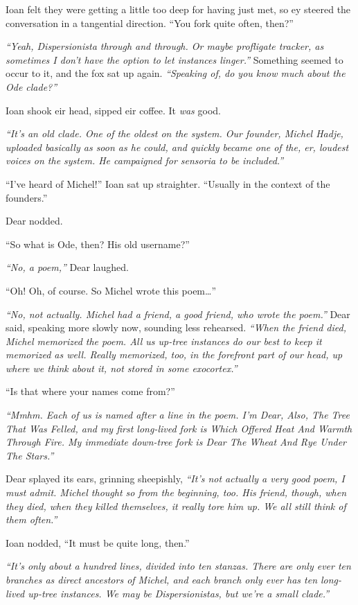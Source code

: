 Ioan felt they were getting a little too deep for having just met, so ey steered the conversation in a tangential direction. ``You fork quite often, then?''

\emph{``Yeah, Dispersionista through and through. Or maybe profligate tracker, as sometimes I don't have the option to let instances linger.''} Something seemed to occur to it, and the fox sat up again. \emph{``Speaking of, do you know much about the Ode clade?''}

Ioan shook eir head, sipped eir coffee. It \emph{was} good.

\emph{``It's an old clade. One of the oldest on the system. Our founder, Michel Hadje, uploaded basically as soon as he could, and quickly became one of the, er, loudest voices on the system. He campaigned for sensoria to be included.''}

``I've heard of Michel!'' Ioan sat up straighter. ``Usually in the context of the founders.''

Dear nodded.

``So what is Ode, then? His old username?''

\emph{``No, a poem,''} Dear laughed.

``Oh! Oh, of course. So Michel wrote this poem\ldots{}''

\emph{``No, not actually. Michel had a friend, a good friend, who wrote the poem.''} Dear said, speaking more slowly now, sounding less rehearsed. \emph{``When the friend died, Michel memorized the poem. All us up-tree instances do our best to keep it memorized as well. Really memorized, too, in the forefront part of our head, up where we think about it, not stored in some exocortex.''}

``Is that where your names come from?''

\emph{``Mmhm. Each of us is named after a line in the poem. I'm Dear, Also, The Tree That Was Felled, and my first long-lived fork is Which Offered Heat And Warmth Through Fire. My immediate down-tree fork is Dear The Wheat And Rye Under The Stars.''}

Dear splayed its ears, grinning sheepishly, \emph{``It's not actually a very good poem, I must admit. Michel thought so from the beginning, too. His friend, though, when they died, when they killed themselves, it really tore him up. We all still think of them often.''}

Ioan nodded, ``It must be quite long, then.''

\emph{``It's only about a hundred lines, divided into ten stanzas. There are only ever ten branches as direct ancestors of Michel, and each branch only ever has ten long-lived up-tree instances. We may be Dispersionistas, but we're a small clade.''}

